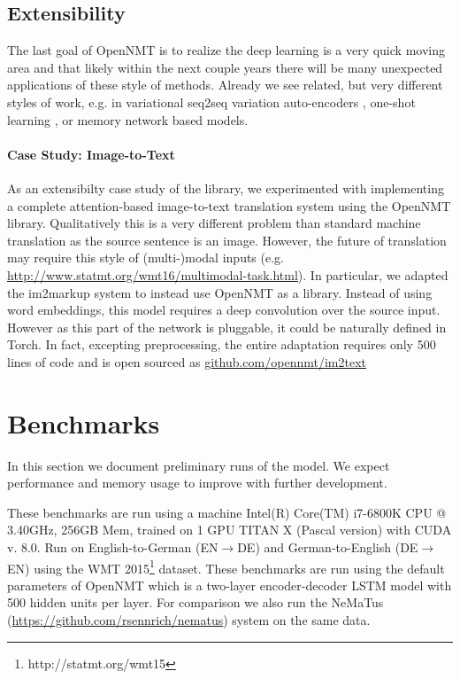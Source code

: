 \documentclass[11pt]{article}
\begin{document}
\subsection{Extensibility}

The last goal of OpenNMT is to realize the deep learning is a very
quick moving area and that likely within the next couple years there
will be many unexpected applications of these style of
methods. Already we see related, but very different styles of work,
e.g.  in variational seq2seq variation auto-encoders
\cite{DBLP:conf/conll/BowmanVVDJB16}, one-shot learning
\cite{DBLP:conf/nips/VinyalsBLKW16}, or memory network \cite{DBLP:journals/corr/WestonCB14} based models.


\paragraph{Case Study: Image-to-Text}

As an extensibilty case study of the library, we experimented with
implementing a complete attention-based image-to-text translation
system \cite{DBLP:journals/corr/XuBKCCSZB15} using the OpenNMT
library. Qualitatively this is a very different problem than standard
machine translation as the source sentence is an image.  However, the
future of translation may require this style of (multi-)modal inputs
(e.g. \url{http://www.statmt.org/wmt16/multimodal-task.html}). In
particular, we adapted the im2markup system
\cite{DBLP:journals/corr/DengKR16} to instead use OpenNMT as a
library.  Instead of using word embeddings, this model requires a deep
convolution over the source input. However as this part of the network
is pluggable, it could be naturally defined in Torch. In fact,
excepting preprocessing, the entire adaptation requires only 500 lines
of code and is open sourced as \url{github.com/opennmt/im2text}

\section{Benchmarks}


In this section we document preliminary runs of the model. We expect
performance and memory usage to improve with further development.

These benchmarks are run using a machine Intel(R) Core(TM) i7-6800K CPU @
3.40GHz, 256GB Mem, trained on 1 GPU TITAN X (Pascal version) with
CUDA v. 8.0.  Run on English-to-German (EN$\rightarrow$DE) and
German-to-English (DE$\rightarrow$EN) using the WMT 2015\footnote{http://statmt.org/wmt15}
dataset. These benchmarks are run using the default parameters of
OpenNMT which is a two-layer encoder-decoder LSTM model with 500
hidden units per layer. For comparison we also run the NeMaTus (\url{https://github.com/rsennrich/nematus}) system on 
the same data.
\end{document}
